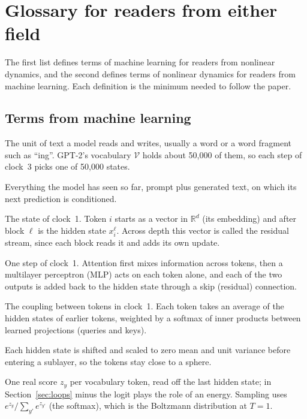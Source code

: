 \section{Glossary for readers from either field}
\label{app:glossary}

The first list defines terms of machine learning for readers from nonlinear dynamics, and the second defines terms of nonlinear dynamics for readers from machine learning. Each definition is the minimum needed to follow the paper.

\subsection*{Terms from machine learning}
\begin{description}[leftmargin=0pt,itemsep=1pt,font=\normalfont\bfseries]
\item[Token, vocabulary.] The unit of text a model reads and writes, usually a word or a word fragment such as ``ing''. GPT-2's vocabulary $\mathcal V$ holds about 50{,}000 of them, so each step of clock~3 picks one of 50{,}000 states.
\item[Context.] Everything the model has seen so far, prompt plus generated text, on which its next prediction is conditioned.
\item[Embedding, hidden state, residual stream.] The state of clock~1. Token $i$ starts as a vector in $\mathbb{R}^d$ (its embedding) and after block $\ell$ is the hidden state $x_i^\ell$. Across depth this vector is called the residual stream, since each block reads it and adds its own update.
\item[Transformer block.] One step of clock~1. Attention first mixes information across tokens, then a multilayer perceptron (MLP) acts on each token alone, and each of the two outputs is added back to the hidden state through a skip (residual) connection.
\item[Attention.] The coupling between tokens in clock~1. Each token takes an average of the hidden states of earlier tokens, weighted by a softmax of inner products between learned projections (queries and keys).
\item[Layer normalization.] Each hidden state is shifted and scaled to zero mean and unit variance before entering a sublayer, so the tokens stay close to a sphere.
\item[Logits, softmax.] One real score $z_y$ per vocabulary token, read off the last hidden state; in Section~\ref{sec:loops} minus the logit plays the role of an energy. Sampling uses $e^{z_y}/\sum_{y'}e^{z_{y'}}$ (the softmax), which is the Boltzmann distribution at $T=1$.

\end{description}
